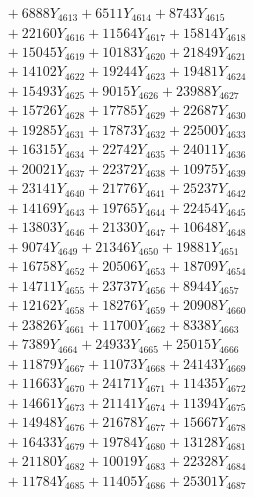 \documentclass[a4paper,10pt]{article}
\begin{document}
{\begin{align}
&\;  + 6888 Y_{4613} + 6511 Y_{4614} + 8743 Y_{4615} \\[0.3ex]
&\;  + 22160 Y_{4616} + 11564 Y_{4617} + 15814 Y_{4618} \\[0.5ex]\allowbreak
&\;  + 15045 Y_{4619} + 10183 Y_{4620} + 21849 Y_{4621} \\[0.3ex]
&\;  + 14102 Y_{4622} + 19244 Y_{4623} + 19481 Y_{4624} \\[0.3ex]
&\;  + 15493 Y_{4625} + 9015 Y_{4626} + 23988 Y_{4627} \\[0.3ex]
&\;  + 15726 Y_{4628} + 17785 Y_{4629} + 22687 Y_{4630} \\[0.3ex]
&\;  + 19285 Y_{4631} + 17873 Y_{4632} + 22500 Y_{4633} \\[0.3ex]
&\;  + 16315 Y_{4634} + 22742 Y_{4635} + 24011 Y_{4636} \\[0.3ex]
&\;  + 20021 Y_{4637} + 22372 Y_{4638} + 10975 Y_{4639} \\[0.3ex]
&\;  + 23141 Y_{4640} + 21776 Y_{4641} + 25237 Y_{4642} \\[0.3ex]
&\;  + 14169 Y_{4643} + 19765 Y_{4644} + 22454 Y_{4645} \\[0.3ex]
&\;  + 13803 Y_{4646} + 21330 Y_{4647} + 10648 Y_{4648} \\[0.5ex]\allowbreak
&\;  + 9074 Y_{4649} + 21346 Y_{4650} + 19881 Y_{4651} \\[0.3ex]
&\;  + 16758 Y_{4652} + 20506 Y_{4653} + 18709 Y_{4654} \\[0.3ex]
&\;  + 14711 Y_{4655} + 23737 Y_{4656} + 8944 Y_{4657} \\[0.3ex]
&\;  + 12162 Y_{4658} + 18276 Y_{4659} + 20908 Y_{4660} \\[0.3ex]
&\;  + 23826 Y_{4661} + 11700 Y_{4662} + 8338 Y_{4663} \\[0.3ex]
&\;  + 7389 Y_{4664} + 24933 Y_{4665} + 25015 Y_{4666} \\[0.3ex]
&\;  + 11879 Y_{4667} + 11073 Y_{4668} + 24143 Y_{4669} \\[0.3ex]
&\;  + 11663 Y_{4670} + 24171 Y_{4671} + 11435 Y_{4672} \\[0.3ex]
&\;  + 14661 Y_{4673} + 21141 Y_{4674} + 11394 Y_{4675} \\[0.3ex]
&\;  + 14948 Y_{4676} + 21678 Y_{4677} + 15667 Y_{4678} \\[0.5ex]\allowbreak
&\;  + 16433 Y_{4679} + 19784 Y_{4680} + 13128 Y_{4681} \\[0.3ex]
&\;  + 21180 Y_{4682} + 10019 Y_{4683} + 22328 Y_{4684} \\[0.3ex]
&\;  + 11784 Y_{4685} + 11405 Y_{4686} + 25301 Y_{4687} \\[0.3ex]

\end{align}}
\end{document}
